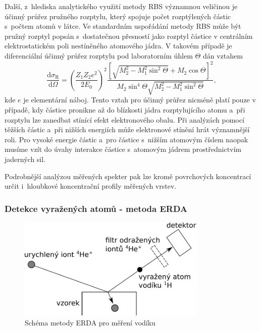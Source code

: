 \documentclass[12pt]{article}
\begin{document}
Další, z~hlediska analytického využití metody RBS významnou veličinou je účinný průřez pružného rozptylu, který spojuje počet rozptýlených částic s~počtem atomů v látce. Ve standardním uspořádání metody RBS může být pružný rozptyl popsán s~dostatečnou přesností jako rozptyl částice v centrálním elektrostatickém poli nestíněného atomového jádra. V takovém případě je diferenciální účinný průřez rozptylu pod laboratorním úhlem $\Theta$ dán vztahem
\begin{equation}
\frac{\mathrm{d}\sigma_\mathrm{R}}{\mathrm{d}\Omega} = 
\left( \frac{Z_1 Z_2 e^2}{2 E_0} \right)^2
 \frac{ \left[ \sqrt{M_2^2 - M_1^2\sin^2\Theta} + M_2 \cos\Theta \right]^2 }{M_2 \sin^4 \Theta \sqrt{M_2^2 - M_1^2\sin^2\Theta}}  \mathrm{,}
\end{equation}
kde $e$ je elementární náboj. Tento vztah pro účinný průřez nicméně platí pouze v případě, kdy částice pronikne až do blízkosti jádra rozptylujícího atomu a~při rozptylu lze zanedbat stínící efekt elektronového obalu. Při analýzách pomocí těžších částic a~při nižších energiích může elektronové stínění hrát významnější roli. Pro vysoké energie částic a~pro částice s~nižším atomovým číslem naopak musíme vzít do úvahy interakce částice s~atomovým jádrem prostřednictvím jaderných sil.

Podrobnější analýzou měřených spekter pak lze kromě povrchových koncentrací určit i~hloubkové koncentrační profily měřených vrstev. 


\subsubsection{Detekce vyražených atomů - metoda ERDA}
\begin{figure}[bthp]
  \centering
  \includegraphics[width=90mm]{ERDA.pdf}
  \caption{Schéma metody ERDA pro měření vodíku}
  \label{ERDA}
\end{figure}
\end{document}

